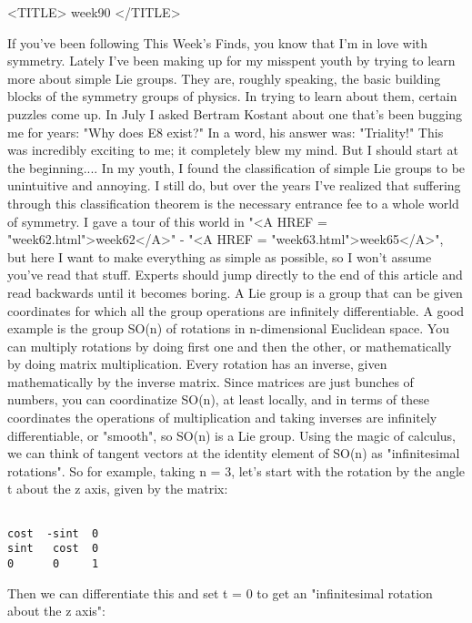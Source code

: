 
<TITLE> week90 </TITLE>


If you've been following This Week's Finds, you know that I'm in love
with symmetry.  Lately I've been making up for my misspent youth by
trying to learn more about simple Lie groups.  They are, roughly 
speaking, the basic building blocks of the symmetry groups of physics.    
In trying to learn about them, certain puzzles come up.  In July 
I asked Bertram Kostant about one that's been bugging me for years:
"Why does E8 exist?"  In a word, his answer was: "Triality!"  This was
incredibly exciting to me; it completely blew my mind.  But I should
start at the beginning....
In my youth, I found the classification of simple Lie groups to be
unintuitive and annoying.  I still do, but over the years I've
realized that suffering through this classification theorem is the
necessary entrance fee to a whole world of symmetry.  I gave a tour of 
this world in "<A HREF = "week62.html">week62</A>" - "<A HREF = 
"week63.html">week65</A>", but here I want to make everything as
simple as possible, so I won't assume you've read that stuff.  Experts
should jump directly to the end of this article and read backwards
until it becomes boring.
A Lie group is a group that can be given coordinates for which all the group
operations are infinitely differentiable.  A good example is the group
SO(n) of rotations in n-dimensional Euclidean space.  You can multiply
rotations by doing first one and then the other, or mathematically by
doing matrix multiplication.  Every rotation has an inverse, given
mathematically by the inverse matrix.  Since matrices are just bunches
of numbers, you can coordinatize SO(n), at least locally, and in terms
of these coordinates the operations of multiplication and taking inverses 
are infinitely differentiable, or "smooth", so SO(n) is a Lie group.
Using the magic of calculus, we can think of tangent vectors at the
identity element of SO(n) as "infinitesimal rotations".  So for
example, taking n = 3, let's start with the rotation by the angle t
about the z axis, given by the matrix:

\begin{verbatim}

cost  -sint  0
sint   cost  0
0      0     1
\end{verbatim}
    
Then we can differentiate this and set t = 0 to get an "infinitesimal
rotation about the z axis":


